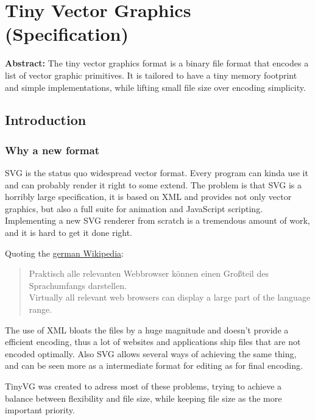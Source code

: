 \documentclass[]{article}
\begin{document}
\hypertarget{tiny-vector-graphics-specification}{%
\section{Tiny Vector Graphics
(Specification)}\label{tiny-vector-graphics-specification}}

\textbf{Abstract:} The tiny vector graphics format is a binary file
format that encodes a list of vector graphic primitives. It is tailored
to have a tiny memory footprint and simple implementations, while
lifting small file size over encoding simplicity.

\hypertarget{introduction}{%
\subsection{Introduction}\label{introduction}}

\hypertarget{why-a-new-format}{%
\subsubsection{Why a new format}\label{why-a-new-format}}

SVG is the status quo widespread vector format. Every program can kinda
use it and can probably render it right to some extend. The problem is
that SVG is a horribly large specification, it is based on XML and
provides not only vector graphics, but also a full suite for animation
and JavaScript scripting. Implementing a new SVG renderer from scratch
is a tremendous amount of work, and it is hard to get it done right.

Quoting the \href{https://de.wikipedia.org/wiki/Scalable_Vector_Graphics}{german Wikipedia}:

\begin{quote}
Praktisch alle relevanten Webbrowser können einen Großteil des
Sprachumfangs darstellen.\\
Virtually all relevant web browsers can display a large part of the
language range.
\end{quote}

The use of XML bloats the files by a huge magnitude and doesn't provide
a efficient encoding, thus a lot of websites and applications ship files
that are not encoded optimally. Also SVG allows several ways of
achieving the same thing, and can be seen more as a intermediate format
for editing as for final encoding.

TinyVG was created to adress most of these problems, trying to achieve a
balance between flexibility and file size, while keeping file size as
the more important priority.
\end{document}
